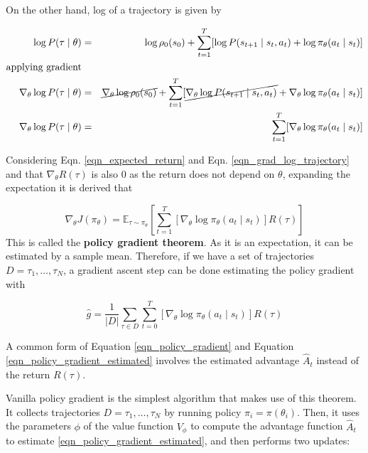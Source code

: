 \documentclass[12pt, english]{article}
\begin{document}
On the other hand, log of a trajectory is given by

\begin{eqnarray}
  \log P(\tau \mid \theta) &=& \log \rho_0 (s_0) + \sum_{t=1}^T [\log P(s_{t+1} \mid s_t, a_t) + \log \pi_\theta (a_t \mid s_t)] \\
  \text{applying gradient} \nonumber \\
  \nabla_\theta \log P(\tau \mid \theta) &=& \cancel{\nabla_\theta \log \rho_0 (s_0)} + \sum_{t=1}^T[ \cancel{\nabla_\theta \log P(s_{t+1} \mid s_t, a_t)} + \nabla_\theta \log \pi_\theta (a_t \mid s_t)] \nonumber \\
  \nabla_\theta \log P(\tau \mid \theta) &=& \sum_{t=1}^T[\nabla_\theta \log \pi_\theta (a_t \mid s_t)] \label{eqn_grad_log_trajectory}
\end{eqnarray}

Considering Eqn. \ref{eqn_expected_return} and Eqn. \ref{eqn_grad_log_trajectory} and that $\nabla_\theta R(\tau)$ is also $0$ as the return does not depend on $\theta$, expanding the expectation it is derived that

\begin{equation}
  \label{eqn_policy_gradient}
  \nabla_\theta J(\pi_\theta) = \mathbb{E}_{\tau \sim \pi_\theta} [\sum_{t=1}^T[\nabla_\theta \log \pi_\theta (a_t \mid s_t)] R(\tau)]
\end{equation}
%
This is called the \textbf{policy gradient theorem}. As it is an expectation, it can be estimated by a sample mean. Therefore, if we have a set of trajectories $D = {\tau_1, \dots, \tau_N}$, a gradient ascent step can be done estimating the policy gradient with

\begin{equation}
  \label{eqn_policy_gradient_estimated}
  \hat{g} = \frac{1}{|D|} \sum_{\tau \in D} \sum_{t=0}^T[\nabla_\theta \log \pi_\theta (a_t \mid s_t)] R(\tau)
\end{equation}

A common form of Equation \ref{eqn_policy_gradient} and Equation \ref{eqn_policy_gradient_estimated} involves the estimated advantage $\hat{A}_t$ instead of the return $R(\tau)$.

Vanilla policy gradient is the simplest algorithm that makes use of this theorem. It collects trajectories $D = {\tau_1, \dots, \tau_N}$ by running policy $\pi_i = \pi(\theta_i)$. Then, it uses the parameters $\phi$ of the value function $V_\phi$ to compute the advantage function $\hat{A}_t$ to estimate \ref{eqn_policy_gradient_estimated}, and then performs two updates:
\end{document}

